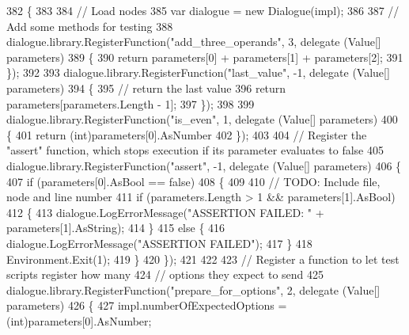 \begin{DoxyCode}
382         \{
383 
384             \textcolor{comment}{// Load nodes}
385             var dialogue = \textcolor{keyword}{new} Dialogue(impl);
386 
387             \textcolor{comment}{// Add some methods for testing}
388             dialogue.library.RegisterFunction(\textcolor{stringliteral}{"add\_three\_operands"}, 3, delegate (Value[] parameters)
389             \{
390                 \textcolor{keywordflow}{return} parameters[0] + parameters[1] + parameters[2];
391             \});
392 
393             dialogue.library.RegisterFunction(\textcolor{stringliteral}{"last\_value"}, -1, delegate (Value[] parameters)
394             \{
395                 \textcolor{comment}{// return the last value}
396                 \textcolor{keywordflow}{return} parameters[parameters.Length - 1];
397             \});
398 
399             dialogue.library.RegisterFunction(\textcolor{stringliteral}{"is\_even"}, 1, delegate (Value[] parameters)
400             \{
401                 \textcolor{keywordflow}{return} (\textcolor{keywordtype}{int})parameters[0].AsNumber %
402             \});
403 
404             \textcolor{comment}{// Register the "assert" function, which stops execution if its parameter evaluates to false}
405             dialogue.library.RegisterFunction(\textcolor{stringliteral}{"assert"}, -1, delegate (Value[] parameters)
406             \{
407                 \textcolor{keywordflow}{if} (parameters[0].AsBool == \textcolor{keyword}{false})
408                 \{
409 
410                     \textcolor{comment}{// TODO: Include file, node and line number}
411                     \textcolor{keywordflow}{if} (parameters.Length > 1 && parameters[1].AsBool)
412                     \{
413                         dialogue.LogErrorMessage(\textcolor{stringliteral}{"ASSERTION FAILED: "} + parameters[1].AsString);
414                     \}
415                     \textcolor{keywordflow}{else} \{
416                         dialogue.LogErrorMessage(\textcolor{stringliteral}{"ASSERTION FAILED"});
417                     \}
418                     Environment.Exit(1);
419                 \}
420             \});
421 
422 
423             \textcolor{comment}{// Register a function to let test scripts register how many}
424             \textcolor{comment}{// options they expect to send}
425             dialogue.library.RegisterFunction(\textcolor{stringliteral}{"prepare\_for\_options"}, 2, delegate (Value[] parameters)
426             \{
427                 impl.numberOfExpectedOptions = (int)parameters[0].AsNumber;

\end{DoxyCode}
